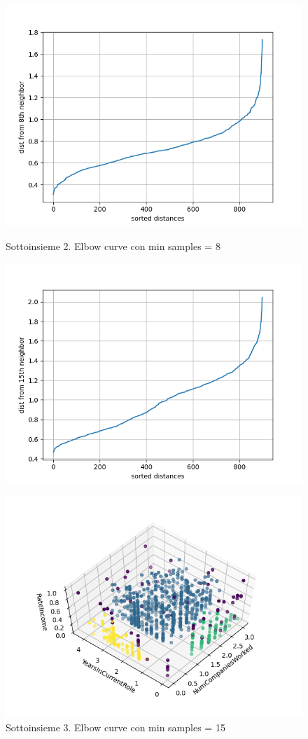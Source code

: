 \documentclass[a4paper,9pt]{article}
\begin{document}
\begin{figure}[H]
\begin{minipage}[b]{0.45\textwidth}
\centering
\includegraphics[width=\textwidth]{2.png}
\caption{Sottoinsieme 2. Elbow curve con min samples =  8}
\label{etichetta1}
\centering
\includegraphics[width=\textwidth]{5 (1).png}
\caption{Sottoinsieme 3. Elbow curve con min samples =  15}
\label{etichetta1}
\end{minipage}
\hfill
\begin{minipage}[b]{0.45\textwidth}
\centering
\includegraphics[width=\textwidth]{22.png}

\end{minipage}
\end{figure}
\end{document}
